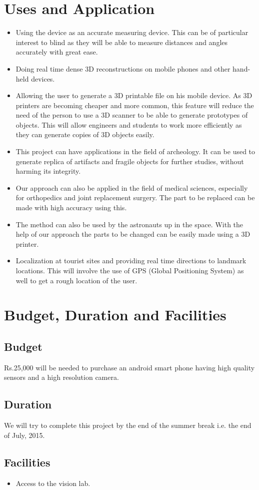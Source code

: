 \documentclass{article}
\begin{document}
	
	

	\section{Uses and Application}
			\begin{itemize}
				\item Using the device as an accurate measuring device. This can be of particular interest to blind as they will be able to measure distances and angles accurately with great ease.
				\item Doing real time dense 3D reconstructions on mobile phones and other hand-held devices. 
				\item Allowing the user to generate a 3D printable file on his mobile device. As 3D printers are becoming cheaper and more common, this feature will reduce the need of the person to use a 3D scanner to be able to generate prototypes of objects. This will allow engineers and students to work more efficiently as they can generate copies of 3D objects easily.
				\item This project can have applications in the field of archeology. It can be used to generate replica of artifacts and fragile objects for further studies, without harming its integrity.
				\item Our approach can also be applied in the field of medical sciences, especially for orthopedics and joint replacement surgery. The part to be replaced can be made with high accuracy using this.
				\item The method can also be used by the astronauts up in the space. With the help of our approach the parts to be changed can be easily made using a 3D printer.
				\item Localization at tourist sites and providing real time directions to landmark locations. This will involve the use of GPS (Global Positioning System) as well to get a rough location of the user.
			\end{itemize}
	\section{Budget, Duration and Facilities}	
		\subsection{Budget}
			Rs.25,000 will be needed to purchase an android smart phone having high quality sensors and a high resolution camera.
		\subsection{Duration}
			We will try to complete this project by the end of the summer break i.e. the end of July, 2015. 
		\subsection{Facilities}
		    \begin{itemize}
		    \item Access to the vision lab.
		    \end{itemize}
\end{document}
